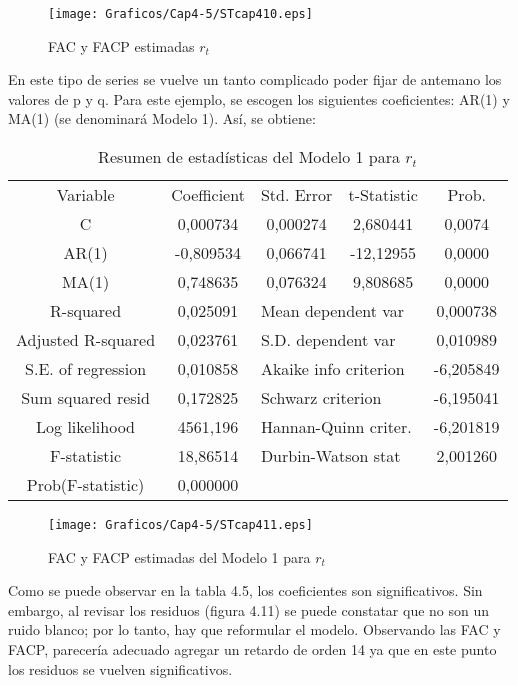 \begin{figure}[H]
\centering
\texttt{[image: Graficos/Cap4-5/STcap410.eps]}
\caption{FAC y FACP estimadas $r_{t}$}
\end{figure}


En este tipo de series se vuelve un tanto complicado poder fijar de antemano los valores de p y q. Para este ejemplo, se escogen los siguientes coeficientes: AR(1) y MA(1) (se denominar\'{a} Modelo 1). As\'{i}, se obtiene: 

\begin{table}[H]
\centering
\begin{tabular}{ccccc}\hline\hline
Variable & Coefficient & Std. Error & t-Statistic & Prob.\\
C & 0,000734 & 0,000274 & 2,680441 & 0,0074 \\
AR(1) & -0,809534 & 0,066741 & -12,12955 & 0,0000 \\
MA(1) & 0,748635 & 0,076324 & 9,808685 & 0,0000 \\ \hline\hline
R-squared & 0,025091 & \multicolumn{2}{l}{Mean dependent var} & 0,000738 \\
Adjusted R-squared & 0,023761 & \multicolumn{2}{l}{S.D. dependent var} & 0,010989 \\
S.E. of regression & 0,010858 & \multicolumn{2}{l}{Akaike info criterion} & -6,205849 \\
Sum squared resid & 0,172825 & \multicolumn{2}{l}{Schwarz criterion} & -6,195041 \\
Log likelihood & 4561,196 & \multicolumn{2}{l}{Hannan-Quinn criter.} & -6,201819 \\
F-statistic & 18,86514 & \multicolumn{2}{l}{Durbin-Watson stat} & 2,001260 \\
Prob(F-statistic) & 0,000000 & & & \\ \hline\hline
\end{tabular}
\caption{Resumen de estad\'{i}sticas del Modelo 1 para $r_{t}$}
\end{table}

\begin{figure}[H]
\centering
\texttt{[image: Graficos/Cap4-5/STcap411.eps]}
\caption{FAC y FACP estimadas del Modelo 1 para $r_{t}$}
\end{figure}

Como se puede observar en la tabla 4.5, los coeficientes son significativos. Sin embargo, al revisar los residuos (figura 4.11) se puede constatar que no son un ruido blanco; por lo tanto, hay que reformular el modelo. Observando las FAC y FACP, parecer\'{i}a adecuado agregar un retardo de orden 14 ya que en este punto los residuos se vuelven significativos.\newline

